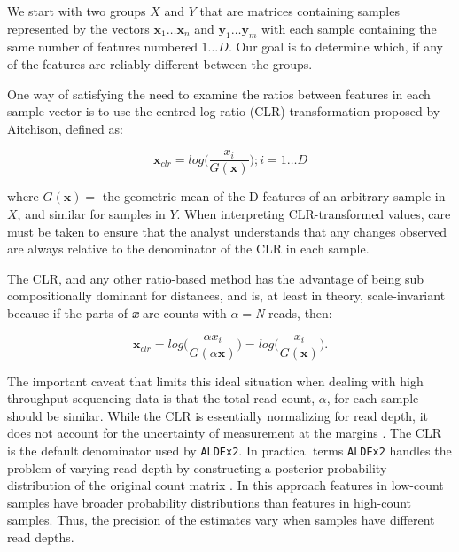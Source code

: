 \documentclass[graybox]{svmult}
\begin{document}
We start with two groups $X$ and $Y$ that are matrices containing samples represented by the vectors $\textbf{x}_1 \dots \textbf{x}_n$ and $\textbf{y}_1 \dots \textbf{y}_m$ with each sample containing the same number of features numbered $1 \dots D$. Our goal is to determine which, if any of the features are reliably different between the groups. 

One way of satisfying the need to examine the ratios between features  in each sample vector is to use the centred-log-ratio (CLR) transformation proposed by Aitchison, defined as: 

\begin{equation}
\textbf{x}_{clr} = log  \Big( \frac{x_{i}}{G(\textbf{x})}   \Big); i=1\dots D
\label{eq:CLR}
\end{equation}

where $G(\textbf{x}) =$ the geometric mean of the D features of  an arbitrary sample in $X$, and similar for samples in $Y$. When interpreting CLR-transformed values, care must be taken  to ensure that the analyst understands that any changes observed are always relative to the denominator of the CLR in each sample. 


The CLR, and any other ratio-based method has the advantage of being sub compositionally dominant for distances, and is, at least in theory, scale-invariant because if the parts of \textit{\textbf{x}} are counts with $\alpha=$\textit{N} reads, then: 

\begin{equation}
	\textbf{x}_{clr}= log\Big( \frac{\alpha x_i}{G(\alpha \textbf{x})}   \Big) =  log\Big( \frac{x_i}{G(\textbf{x})}  \Big).
\label{eq:equip}
\end{equation}

The  important caveat that limits this ideal situation when dealing with high throughput sequencing data is that the total read count, $\alpha$, for each sample should be similar. While the CLR is essentially normalizing for read depth, it does not account for  the uncertainty of measurement at the margins \cite{gloorAJS:2016,fernandes:2013}.
The CLR is the default denominator used by \texttt{ALDEx2}. In practical terms \texttt{ALDEx2} handles the problem of varying read depth by constructing a posterior probability distribution of the original count matrix \cite{fernandes:2013}.  In this approach features in low-count samples have broader probability distributions than features in high-count samples. Thus, the precision of the estimates vary when samples have different read depths.
\end{document}
